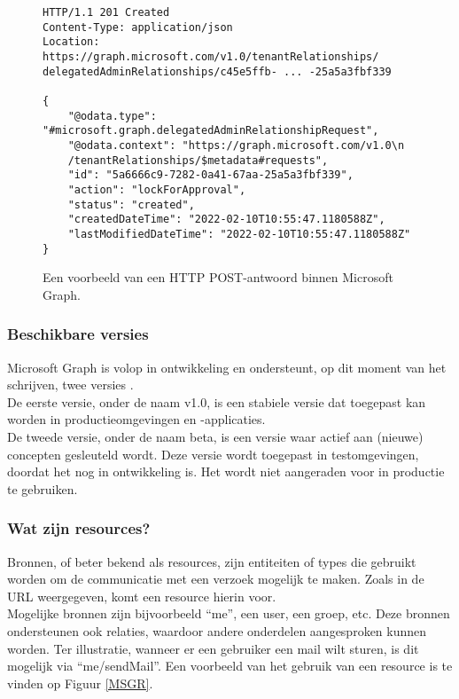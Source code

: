 \begin{figure}[h]
    \scriptsize
    \begin{verbatim}
HTTP/1.1 201 Created
Content-Type: application/json
Location: https://graph.microsoft.com/v1.0/tenantRelationships/
delegatedAdminRelationships/c45e5ffb- ... -25a5a3fbf339

{
    "@odata.type": "#microsoft.graph.delegatedAdminRelationshipRequest",
    "@odata.context": "https://graph.microsoft.com/v1.0\n
    /tenantRelationships/$metadata#requests",
    "id": "5a6666c9-7282-0a41-67aa-25a5a3fbf339",
    "action": "lockForApproval",
    "status": "created",
    "createdDateTime": "2022-02-10T10:55:47.1180588Z",
    "lastModifiedDateTime": "2022-02-10T10:55:47.1180588Z"
}
    \end{verbatim}    
    \caption[Voorbeeld Microsoft Graph POST-antwoord]{Een voorbeeld van een \ac{HTTP} POST-antwoord binnen Microsoft Graph.}
    \label{MSPRES}
\end{figure}

\subsubsection{Beschikbare versies}

Microsoft Graph is volop in ontwikkeling en ondersteunt, op dit moment van het schrijven, twee versies \Autocite{Microsoft2023f}. \\

De eerste versie, onder de naam v1.0, is een stabiele versie dat toegepast kan worden in productieomgevingen en -applicaties. \\

De tweede versie, onder de naam beta, is een versie waar actief aan (nieuwe) concepten gesleuteld wordt. Deze versie wordt toegepast in testomgevingen, doordat het nog in ontwikkeling is. Het wordt niet aangeraden voor in productie te gebruiken. 

\subsubsection{Wat zijn resources?}

Bronnen, of beter bekend als resources, zijn entiteiten of types die gebruikt worden om de communicatie met een verzoek mogelijk te maken. Zoals in de \ac{URL} weergegeven, komt een resource hierin voor. \\

Mogelijke bronnen zijn bijvoorbeeld “me”, een user, een groep, etc. Deze bronnen ondersteunen ook relaties, waardoor andere onderdelen aangesproken kunnen worden. Ter illustratie, wanneer er een gebruiker een mail wilt sturen, is dit mogelijk via “me/sendMail”. Een voorbeeld van het gebruik van een resource is te vinden op Figuur \ref{MSGR}. \\

